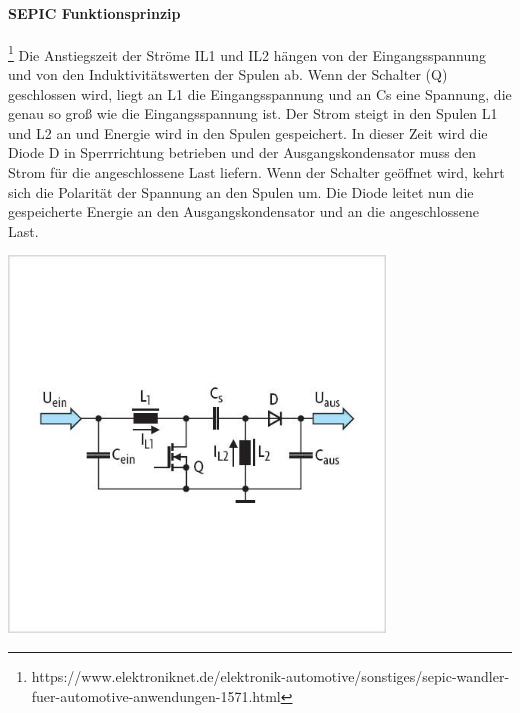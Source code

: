 \documentclass[paper=a4, 12pt]{scrreprt}
\begin{document}
	\paragraph{SEPIC Funktionsprinzip}\footnote{https://www.elektroniknet.de/elektronik-automotive/sonstiges/sepic-wandler-fuer-automotive-anwendungen-1571.html}\hfill \break
	Die Anstiegszeit der Ströme IL1 und IL2 hängen von der Eingangsspannung und von den Induktivitätswerten der Spulen ab. Wenn der Schalter (Q) geschlossen wird, liegt an L1 die Eingangsspannung und an Cs eine Spannung, die genau so groß wie die Eingangsspannung ist. Der Strom steigt in den Spulen L1 und L2 an und Energie wird in den Spulen gespeichert. In dieser Zeit wird die Diode D in Sperrrichtung betrieben und der Ausgangskondensator muss den Strom für die angeschlossene Last liefern. Wenn der Schalter geöffnet wird, kehrt sich die Polarität der Spannung an den Spulen um. Die Diode leitet nun die gespeicherte Energie an den Ausgangskondensator und an die angeschlossene Last.
	\begin{adjustbox}{center,caption={Prinzipschaltung eines SEPIC-Converters},label={fig:SEPIC-Prinzipschaltung},nofloat=figure,vspace=\bigskipamount}
		\includegraphics[height=10cm]{img/SEPIC_PRinzipschaltung.jpg}
	\hfill \break
	\end{adjustbox}
	\pagebreak
\end{document}
